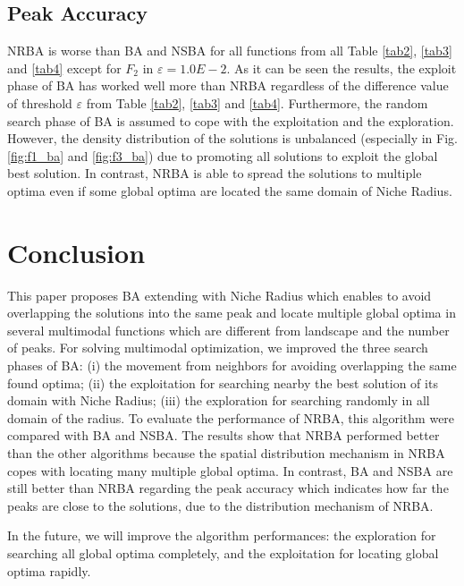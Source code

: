 \documentclass[conference]{IEEEtran}
\begin{document}
\subsection{Peak Accuracy}
NRBA is worse than BA and NSBA for all functions from all Table \ref{tab2}, \ref{tab3} and \ref{tab4} except for $F_2$ in $\varepsilon=1.0E-2$. As it can be seen the results, the exploit phase of BA has worked well more than NRBA regardless of the difference value of threshold $\varepsilon$ from Table \ref{tab2}, \ref{tab3} and \ref{tab4}. Furthermore, the random search phase of BA is assumed to cope with the exploitation and the exploration. However, the density distribution of the solutions is unbalanced (especially in Fig. \ref{fig:f1_ba} and \ref{fig:f3_ba}) due to promoting all solutions to exploit the global best solution. In contrast, NRBA is able to spread the solutions to multiple optima even if some global optima are located the same domain of Niche Radius.

\section{Conclusion}
This paper proposes BA extending with Niche Radius which enables to avoid overlapping the solutions into the same peak and locate multiple global optima in several multimodal functions which are different from landscape and the number of peaks. For solving multimodal optimization, we improved the three search phases of BA: (i) the movement from neighbors for avoiding overlapping the same found optima; (ii) the exploitation for searching nearby the best solution of its domain with Niche Radius; (iii) the exploration for searching randomly in all domain of the radius. To evaluate the performance of NRBA, this algorithm were compared with BA and NSBA. The results show that NRBA performed better than the other algorithms because the spatial distribution mechanism in NRBA copes with locating many multiple global optima. In contrast, BA and NSBA are still better than NRBA regarding the peak accuracy which indicates how far the peaks are close to the solutions, due to the distribution mechanism of NRBA.

In the future, we will improve the algorithm performances: the exploration for searching all global optima completely, and the exploitation for locating global optima rapidly.
\end{document}
